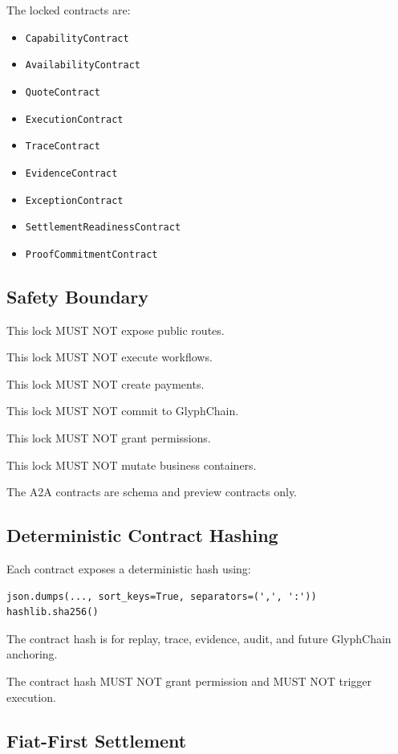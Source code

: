 The locked contracts are:

\begin{itemize}
  \item \texttt{CapabilityContract}
  \item \texttt{AvailabilityContract}
  \item \texttt{QuoteContract}
  \item \texttt{ExecutionContract}
  \item \texttt{TraceContract}
  \item \texttt{EvidenceContract}
  \item \texttt{ExceptionContract}
  \item \texttt{SettlementReadinessContract}
  \item \texttt{ProofCommitmentContract}
\end{itemize}

\subsection{Safety Boundary}

This lock MUST NOT expose public routes.

This lock MUST NOT execute workflows.

This lock MUST NOT create payments.

This lock MUST NOT commit to GlyphChain.

This lock MUST NOT grant permissions.

This lock MUST NOT mutate business containers.

The A2A contracts are schema and preview contracts only.

\subsection{Deterministic Contract Hashing}

Each contract exposes a deterministic hash using:

\begin{verbatim}
json.dumps(..., sort_keys=True, separators=(',', ':'))
hashlib.sha256()
\end{verbatim}

The contract hash is for replay, trace, evidence, audit, and future GlyphChain anchoring.

The contract hash MUST NOT grant permission and MUST NOT trigger execution.

\subsection{Fiat-First Settlement}

